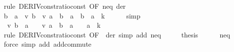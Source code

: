 \begin{isabellebody}
\ {\isacharparenleft}{\kern0pt}rule\ DERIV{\isacharunderscore}{\kern0pt}const{\isacharunderscore}{\kern0pt}ratio{\isacharunderscore}{\kern0pt}const{}\ {\isacharbrackleft}{\kern0pt}OF\ neq\ der{\isacharbrackright}{\kern0pt}{\isacharparenright}{\kern0pt}\isanewline
\ \ \isamarkupfalse%
\ \isamarkupfalse%
\ {\isachardoublequoteopen}{\isacharparenleft}{\kern0pt}b\ {\isacharminus}{\kern0pt}\ a{\isacharparenright}{\kern0pt}\ {\isacharasterisk}{\kern0pt}\ {\isacharparenleft}{\kern0pt}{\isacharparenleft}{\kern0pt}v\ b\ {\isacharminus}{\kern0pt}\ v\ a{\isacharparenright}{\kern0pt}\ {\isacharslash}{\kern0pt}\ {\isacharparenleft}{\kern0pt}b\ {\isacharminus}{\kern0pt}\ a{\isacharparenright}{\kern0pt}{\isacharparenright}{\kern0pt}\ {\isacharequal}{\kern0pt}\ {\isacharparenleft}{\kern0pt}b\ {\isacharminus}{\kern0pt}\ a{\isacharparenright}{\kern0pt}\ {\isacharasterisk}{\kern0pt}\ k{\isachardoublequoteclose}\isanewline
\ \ \ \ \isamarkupfalse%
\ simp\isanewline
\ \ \isamarkupfalse%
\ \isamarkupfalse%
\ {\isachardoublequoteopen}\ {\isacharparenleft}{\kern0pt}v\ {\isacharparenleft}{\kern0pt}{\isacharparenleft}{\kern0pt}b\ {\isacharplus}{\kern0pt}\ a{\isacharparenright}{\kern0pt}\ {\isacharslash}{\kern0pt}\ {}{\isacharparenright}{\kern0pt}\ {\isacharminus}{\kern0pt}\ v\ a{\isacharparenright}{\kern0pt}\ {\isacharslash}{\kern0pt}\ {\isacharparenleft}{\kern0pt}{\isacharparenleft}{\kern0pt}b\ {\isacharplus}{\kern0pt}\ a{\isacharparenright}{\kern0pt}\ {\isacharslash}{\kern0pt}\ {}\ {\isacharminus}{\kern0pt}\ a{\isacharparenright}{\kern0pt}\ {\isacharequal}{\kern0pt}\ k{\isachardoublequoteclose}\isanewline
\ \ \ \ \isamarkupfalse%
\ {\isacharparenleft}{\kern0pt}rule\ DERIV{\isacharunderscore}{\kern0pt}const{\isacharunderscore}{\kern0pt}ratio{\isacharunderscore}{\kern0pt}const{}\ {\isacharbrackleft}{\kern0pt}OF\ {\isacharunderscore}{\kern0pt}\ der{\isacharbrackright}{\kern0pt}{\isacharparenright}{\kern0pt}\ {\isacharparenleft}{\kern0pt}simp\ add{\isacharcolon}{\kern0pt}\ neq{\isacharparenright}{\kern0pt}\isanewline
\ \ \isamarkupfalse%
\ \isamarkupfalse%
\ {\isacharquery}{\kern0pt}thesis\isanewline
\ \ \ \ \isamarkupfalse%
\ neq\ \isamarkupfalse%
\ {\isacharparenleft}{\kern0pt}force\ simp\ add{\isacharcolon}{\kern0pt}\ add{\isachardot}{\kern0pt}commute{\isacharparenright}{\kern0pt}\isanewline
{}\isamarkupfalse%
%
\endisatagproof
{\isafoldproof}%
%

\end{isabellebody}
